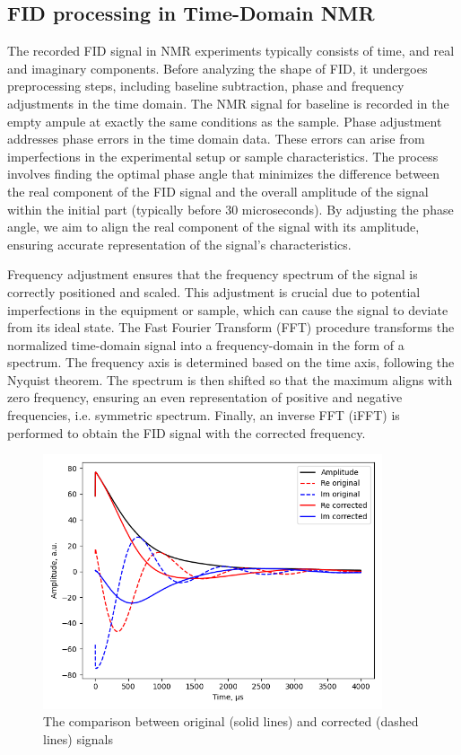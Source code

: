 \documentclass[a4paper,12pt]{article}
\begin{document}
\subsection{FID processing in Time-Domain NMR}\label{sec:FID processing in Time-Domain NMR}

The recorded FID signal in NMR experiments typically consists of time, and real and imaginary components. 
Before analyzing the shape of FID, it undergoes preprocessing steps, including baseline subtraction, phase and frequency adjustments in the time domain.
The NMR signal for baseline is recorded in the empty ampule at exactly the same conditions as the sample. 
Phase adjustment addresses phase errors in the time domain data. 
These errors can arise from imperfections in the experimental setup or sample characteristics. 
The process involves finding the optimal phase angle that minimizes the difference between the real component of the FID signal and the overall amplitude of the signal within the initial part (typically before 30 microseconds). 
By adjusting the phase angle, we aim to align the real component of the signal with its amplitude, ensuring accurate representation of the signal's characteristics.

Frequency adjustment ensures that the frequency spectrum of the signal is correctly positioned and scaled.
This adjustment is crucial due to potential imperfections in the equipment or sample, which can cause the signal to deviate from its ideal state. 
The Fast Fourier Transform (FFT) procedure transforms the normalized time-domain signal into a frequency-domain in the form of a spectrum. 
The frequency axis is determined based on the time axis, following the Nyquist theorem. 
The spectrum is then shifted so that the maximum aligns with zero frequency, ensuring an even representation of positive and negative frequencies, i.e. symmetric spectrum. 
Finally, an inverse FFT (iFFT) is performed to obtain the FID signal with the corrected frequency.

\begin{figure}[H]
  \centering
  \includegraphics[width=10cm]{images/Original_Corrected_FID.png}
  \caption{The comparison between original (solid lines) and corrected (dashed lines) signals}
  \label{fig:Original_Corrected_FID}
\end{figure}
\end{document}
